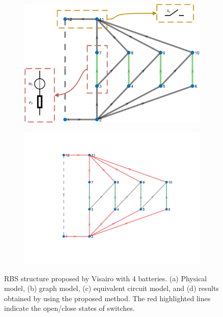 \documentclass{article}
\begin{document}
\begin{figure}[htbp]
\begin{subfigure}[b]{0.45\textwidth}
        \includegraphics[width=\textwidth]{../attachments/f-dege-4-modify.png}
        \caption{}
        \label{fig:f4-circ}
    \end{subfigure}
    \hspace{0.05\textwidth}
    \begin{subfigure}[b]{0.45\textwidth}
        \includegraphics[width=\textwidth]{../attachments/f-dege-mac-4.png}
        \caption{}
        \label{fig:f4-mac}
    \end{subfigure}
    \caption{ RBS structure proposed by Visairo\cite{visairoReconfigurableBatteryPack2008} with 4 batteries. (a) Physical model, (b) graph model, (c) equivalent circuit model, and (d) results obtained by using the proposed method. The red highlighted lines indicate the open/close states of switches.}
    \label{fig:f4-all}
\end{figure}
\end{document}
